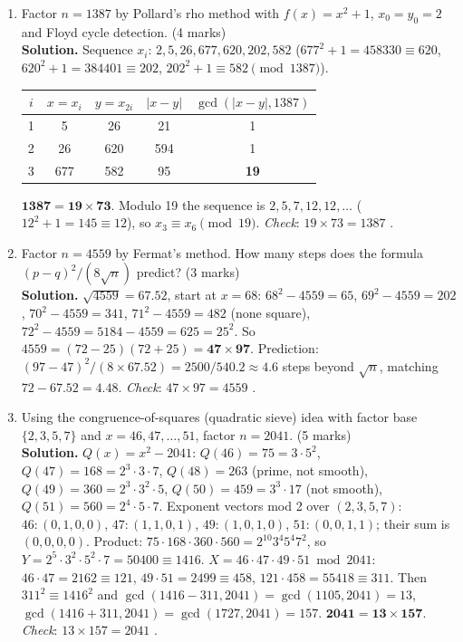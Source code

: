 \begin{enumerate}[leftmargin=1.6em,itemsep=4pt]
  \item Factor $n = 1387$ by Pollard's rho method with $f(x) = x^2 + 1$, $x_0 = y_0 = 2$ and Floyd cycle detection. \hfill(4 marks)\\
  \textbf{Solution.} Sequence $x_i$: $2, 5, 26, 677, 620, 202, 582$ ($677^2 + 1 = 458330 \equiv 620$, $620^2 + 1 = 384401 \equiv 202$, $202^2 + 1 \equiv 582 \pmod{1387}$).
  \begin{center}\small
  \begin{tabular}{@{}ccccc@{}}
  \toprule
  $i$ & $x = x_i$ & $y = x_{2i}$ & $|x - y|$ & $\gcd(|x - y|, 1387)$\\
  \midrule
  1 & 5 & 26 & 21 & 1\\
  2 & 26 & 620 & 594 & 1\\
  3 & 677 & 582 & 95 & \textbf{19}\\
  \bottomrule
  \end{tabular}
  \end{center}
  $\mathbf{1387 = 19 \times 73}$. Modulo 19 the sequence is $2, 5, 7, 12, 12, \dots$ ($12^2 + 1 = 145 \equiv 12$), so $x_3 \equiv x_6 \pmod{19}$. \emph{Check}: $19 \times 73 = 1387$ \checkmark.

  \item Factor $n = 4559$ by Fermat's method. How many steps does the formula $(p - q)^2/(8\sqrt n)$ predict? \hfill(3 marks)\\
  \textbf{Solution.} $\sqrt{4559} = 67.52$, start at $x = 68$: $68^2 - 4559 = 65$, $69^2 - 4559 = 202$, $70^2 - 4559 = 341$, $71^2 - 4559 = 482$ (none square), $72^2 - 4559 = 5184 - 4559 = 625 = 25^2$. So $4559 = (72 - 25)(72 + 25) = \mathbf{47 \times 97}$. Prediction: $(97 - 47)^2/(8 \times 67.52) = 2500/540.2 \approx 4.6$ steps beyond $\sqrt n$, matching $72 - 67.52 = 4.48$. \emph{Check}: $47 \times 97 = 4559$ \checkmark.

  \item Using the congruence-of-squares (quadratic sieve) idea with factor base $\{2, 3, 5, 7\}$ and $x = 46, 47, \dots, 51$, factor $n = 2041$. \hfill(5 marks)\\
  \textbf{Solution.} $Q(x) = x^2 - 2041$: $Q(46) = 75 = 3 \cdot 5^2$, $Q(47) = 168 = 2^3 \cdot 3 \cdot 7$, $Q(48) = 263$ (prime, not smooth), $Q(49) = 360 = 2^3 \cdot 3^2 \cdot 5$, $Q(50) = 459 = 3^3 \cdot 17$ (not smooth), $Q(51) = 560 = 2^4 \cdot 5 \cdot 7$. Exponent vectors mod 2 over $(2, 3, 5, 7)$: $46: (0,1,0,0)$, $47: (1,1,0,1)$, $49: (1,0,1,0)$, $51: (0,0,1,1)$; their sum is $(0,0,0,0)$. Product: $75 \cdot 168 \cdot 360 \cdot 560 = 2^{10} 3^4 5^4 7^2$, so $Y = 2^5 \cdot 3^2 \cdot 5^2 \cdot 7 = 50400 \equiv 1416$. $X = 46 \cdot 47 \cdot 49 \cdot 51 \bmod 2041$: $46 \cdot 47 = 2162 \equiv 121$, $49 \cdot 51 = 2499 \equiv 458$, $121 \cdot 458 = 55418 \equiv 311$. Then $311^2 \equiv 1416^2$ and $\gcd(1416 - 311, 2041) = \gcd(1105, 2041) = 13$, $\gcd(1416 + 311, 2041) = \gcd(1727, 2041) = 157$. $\mathbf{2041 = 13 \times 157}$. \emph{Check}: $13 \times 157 = 2041$ \checkmark.


\end{enumerate}
